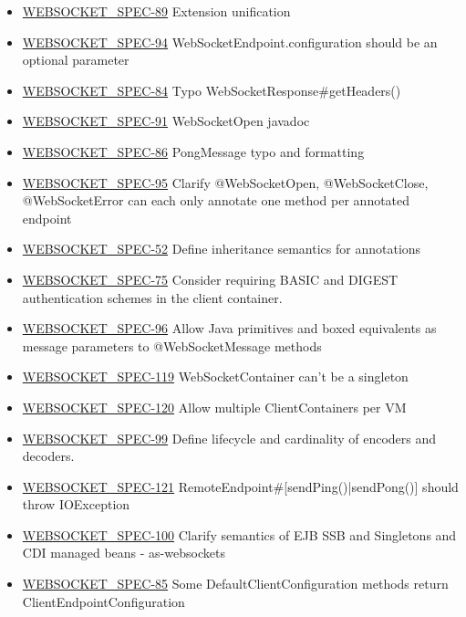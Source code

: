\begin{itemize}
\item \href {http://java.net/jira/browse/WEBSOCKET_SPEC-89}{WEBSOCKET\_SPEC-89} Extension unification
\item \href {http://java.net/jira/browse/WEBSOCKET_SPEC-94}{WEBSOCKET\_SPEC-94} WebSocketEndpoint.configuration should be an optional parameter
\item \href {http://java.net/jira/browse/WEBSOCKET_SPEC-84}{WEBSOCKET\_SPEC-84} Typo WebSocketResponse\#getHeaders()
\item \href {http://java.net/jira/browse/WEBSOCKET_SPEC-91}{WEBSOCKET\_SPEC-91} WebSocketOpen javadoc
\item \href {http://java.net/jira/browse/WEBSOCKET_SPEC-86}{WEBSOCKET\_SPEC-86} PongMessage typo and formatting
\item \href {http://java.net/jira/browse/WEBSOCKET_SPEC-95}{WEBSOCKET\_SPEC-95} Clarify @WebSocketOpen, @WebSocketClose, @WebSocketError can each only annotate one method per annotated endpoint
\item \href {http://java.net/jira/browse/WEBSOCKET_SPEC-52}{WEBSOCKET\_SPEC-52} Define inheritance semantics for annotations
\item \href {http://java.net/jira/browse/WEBSOCKET_SPEC-75}{WEBSOCKET\_SPEC-75} Consider requiring BASIC and DIGEST authentication schemes in the client container.
\item \href {http://java.net/jira/browse/WEBSOCKET_SPEC-96}{WEBSOCKET\_SPEC-96} Allow Java primitives and boxed equivalents as message parameters to @WebSocketMessage methods
\item \href {http://java.net/jira/browse/WEBSOCKET_SPEC-119}{WEBSOCKET\_SPEC-119} WebSocketContainer can't be a singleton
\item \href {http://java.net/jira/browse/WEBSOCKET_SPEC-120}{WEBSOCKET\_SPEC-120} Allow multiple ClientContainers per VM
\item \href {http://java.net/jira/browse/WEBSOCKET_SPEC-99}{WEBSOCKET\_SPEC-99} Define lifecycle and cardinality of encoders and decoders.
\item \href {http://java.net/jira/browse/WEBSOCKET_SPEC-121}{WEBSOCKET\_SPEC-121} RemoteEndpoint\#[sendPing()|sendPong()] should throw IOException
\item \href {http://java.net/jira/browse/WEBSOCKET_SPEC-100}{WEBSOCKET\_SPEC-100} Clarify semantics of EJB SSB and Singletons and CDI managed beans - as-websockets
\item \href {http://java.net/jira/browse/WEBSOCKET_SPEC-85}{WEBSOCKET\_SPEC-85} Some DefaultClientConfiguration methods return ClientEndpointConfiguration

\end{itemize}
